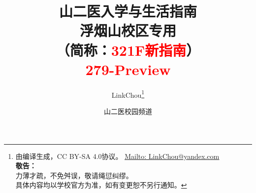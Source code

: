 

\title{%
\normalsize
{\Huge\textbf{山二医入学与生活指南}}\\[6pt]
{\large\textbf{浮烟山校区专用}}\\
（简称：\textcolor{red}{321F新指南}）\\[15pt]
{\large\textcolor{red}{279-Preview}}\vspace*{-25pt}}
\author{LinkChou\thanks{由\LaTeXe 编译生成，CC BY-SA 4.0协议。%
                \uline{\href{Mailto:LinkChou@yandex.com}{Mailto: LinkChou@yandex.com}}\\%
                \textbf{敬告：}\\%
                \indent\indent 力薄才疏，不免舛误，敬请绳愆纠缪。\\%
                \indent\indent 具体内容均以学校官方为准，如有变更恕不另行通知。}\and 山二医校园频道}
\date{\DTMnow}
\maketitle

\renewcommand{\thefootnote}{\arabic{footnote}}

\tableofcontents